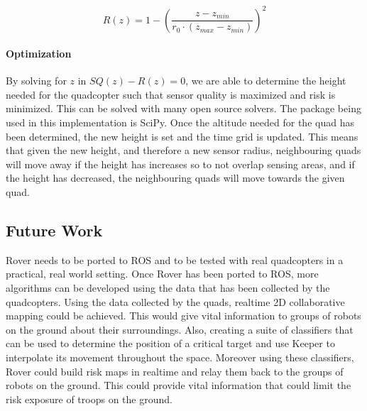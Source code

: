 \documentclass[12pt]{article}
\begin{document}
$$ R(z) = 1 - (\frac{z - z_{min}}{r_0 \cdot (z_{max} - z_{min})}) ^ 2 $$

\paragraph{Optimization}

By solving for $z$ in $SQ(z) - R(z) = 0$, we are able to determine the height
needed for the quadcopter such that sensor quality is maximized and risk is
minimized. This can be solved with many open source solvers. The package being
used in this implementation is SciPy. Once the altitude needed for the quad has
been determined, the new height is set and the time grid is updated. This means
that given the new height, and therefore a new sensor radius, neighbouring
quads will move away if the height has increases so to not overlap sensing
areas, and if the height has decreased, the neighbouring quads will move
towards the given quad.

\subsection{Future Work}

Rover needs to be ported to ROS and to be tested with real quadcopters in a
practical, real world setting. Once Rover has been ported to ROS, more
algorithms can be developed using the data that has been collected by the
quadcopters. Using the data collected by the quads, realtime 2D collaborative
mapping could be achieved. This would give vital information to groups of
robots on the ground about their surroundings. Also, creating a suite of
classifiers that can be used to determine the position of a critical target and
use Keeper to interpolate its movement throughout the space. Moreover using
these classifiers, Rover could build risk maps in realtime and relay them back
to the groups of robots on the ground.  This could provide vital information
that could limit the risk exposure of troops on the ground.
\end{document}
